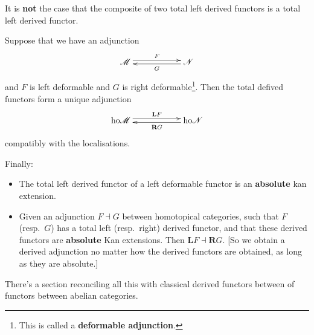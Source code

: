 \documentclass[11pt]{article}
\begin{document}
\begin{3. Derived functors via deformations}
\begin{itemise}
It is \textbf{not} the case that the composite of two total left derived functors is a total left derived functor.
\item Suppose that we have an adjunction 
\[\xymatrix@R=.3cm@C=2cm{
\scrM  \ar@<.6ex>[r]^{F}&
\scrN  \ar@<.4ex>[l]^{G}\\
}\]
and $F$ is left deformable and $G$ is right deformable\footnote{This is called a \textbf{deformable adjunction}.}. Then the total defived functors form a unique adjunction
\[\xymatrix@R=.3cm@C=2cm{
\ho\scrM  \ar@<.6ex>[r]^{\textbf{L}F}&
\ho\scrN  \ar@<.4ex>[l]^{\textbf{R}G}\\
}\]
compatibly with the localisations.
\item Finally:
\begin{itemize}\squishlist
\setlength{\parindent}{.25in}
\item The total left derived functor of a left deformable functor is an \textbf{absolute} kan extension.
\item Given an adjunction $F\dashv G$ between homotopical categories, such that $F$ (resp.\ $G$) has a total left (resp.\ right) derived functor, and that these derived functors are \textbf{absolute} Kan extensions. Then $\textbf{L}F\dashv\textbf{R}G$. [So we obtain a derived adjunction no matter how the derived functors are obtained, as long as they are absolute.]
\end{itemize}
\item There's a section reconciling all this with classical derived functors between of functors between abelian categories.
\end{itemise}
\end{3. Derived functors via deformations}
\end{document}
